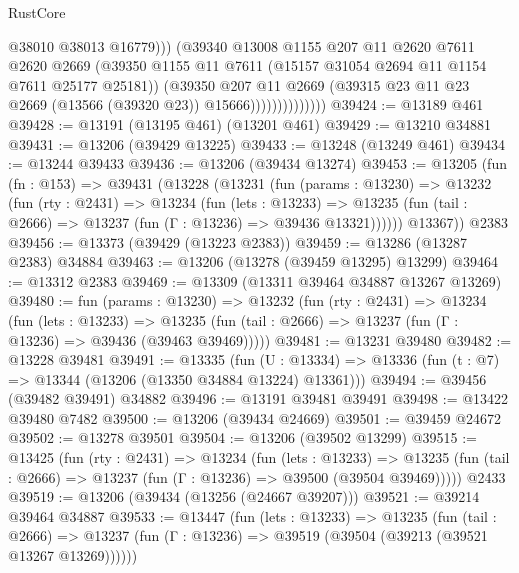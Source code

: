 \begin{lexlean}{RustCore}
\begin{coremodule}
                                @38010
                                @38013
                                @16779)))
                          (@39340
                            @13008
                            @1155
                            @207
                            @11
                            @2620
                            @7611
                            @2620
                            @2669
                            (@39350
                              @1155
                              @11
                              @7611
                              (@15157 @31054 @2694 @11 @1154 @7611 @25177 @25181))
                            (@39350
                              @207
                              @11
                              @2669
                              (@39315 @23 @11 @23 @2669 (@13566 (@39320 @23)) @15666))))))))))))))
@39424 := @13189 @461
@39428 := @13191 (@13195 @461) (@13201 @461)
@39429 := @13210 @34881
@39431 := @13206 (@39429 @13225)
@39433 := @13248 (@13249 @461)
@39434 := @13244 @39433
@39436 := @13206 (@39434 @13274)
@39453 := @13205
    (fun (fn : @153) =>
    @39431
      (@13228
        (@13231
          (fun (params : @13230) =>
          @13232
            (fun (rty : @2431) =>
            @13234
              (fun (lets : @13233) =>
              @13235 (fun (tail : @2666) => @13237 (fun (Γ : @13236) => @39436 @13321))))))
        @13367))
    @2383
@39456 := @13373 (@39429 (@13223 @2383))
@39459 := @13286 (@13287 @2383) @34884
@39463 := @13206 (@13278 (@39459 @13295) @13299)
@39464 := @13312 @2383
@39469 := @13309 (@13311 @39464 @34887 @13267 @13269)
@39480 := fun (params : @13230) =>
  @13232
    (fun (rty : @2431) =>
    @13234
      (fun (lets : @13233) =>
      @13235 (fun (tail : @2666) => @13237 (fun (Γ : @13236) => @39436 (@39463 @39469)))))
@39481 := @13231 @39480
@39482 := @13228 @39481
@39491 := @13335
    (fun (U : @13334) => @13336 (fun (t : @7) => @13344 (@13206 (@13350 @34884 @13224) @13361)))
@39494 := @39456 (@39482 @39491) @34882
@39496 := @13191 @39481 @39491
@39498 := @13422 @39480 @7482
@39500 := @13206 (@39434 @24669)
@39501 := @39459 @24672
@39502 := @13278 @39501
@39504 := @13206 (@39502 @13299)
@39515 := @13425
    (fun (rty : @2431) =>
    @13234
      (fun (lets : @13233) =>
      @13235 (fun (tail : @2666) => @13237 (fun (Γ : @13236) => @39500 (@39504 @39469)))))
    @2433
@39519 := @13206 (@39434 (@13256 (@24667 @39207)))
@39521 := @39214 @39464 @34887
@39533 := @13447
    (fun (lets : @13233) =>
    @13235
      (fun (tail : @2666) =>
      @13237 (fun (Γ : @13236) => @39519 (@39504 (@39213 (@39521 @13267 @13269))))))

\end{coremodule}
\end{lexlean}
